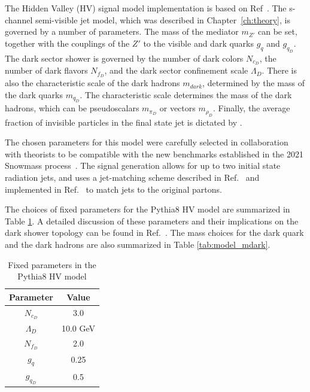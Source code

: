 The Hidden Valley (HV) signal model implementation is based on Ref~\cite{darkqcd}. 
The s-channel semi-visible jet model, which was described in Chapter~\ref{ch:theory}, is governed by a number of parameters. 
The mass of the mediator $m_{Z'}$ can be set, together with the couplings of the $Z'$ to the visible and dark quarks $g_q$ and $g_{q_D}$. 
The dark sector shower is governed by the number of dark colors $N_{c_D}$, the number of dark flavors $N_{f_D}$, and the dark sector confinement scale $\Lambda_D$. 
There is also the characteristic scale of the dark hadrons $m_{dark}$, determined by the mass of the dark quarks $m_{q_D}$. 
The characteristic scale determines the mass of the dark hadrons, which can be pseudoscalars $m_{\pi_D}$ or vectors $m_{\rho_D}$.
Finally, the average fraction of invisible particles in the final state jet is dictated by \rinv. 

The chosen parameters for this model were carefully selected in collaboration with theorists to be compatible with the new benchmarks established in the 2021 Snowmass process~\cite{snowmass}. 
The signal generation allows for up to two initial state radiation jets, and uses a jet-matching scheme described in Ref.~\cite{mlm} and implemented in Ref.~\cite{pythia} to match jets to the original partons.

The choices of fixed parameters for the Pythia8 HV model are summarized in Table \ref{tab:model_fixed_params}.
A detailed discussion of these parameters and their implications on the dark shower topology can be found in Ref.~\cite{snowmass}. 
The mass choices for the dark quark and the dark hadrons are also summarized in Table \ref{tab:model_mdark}. 

\begin{table}
\centering
  \begin{tabular}{ |c|c| }
    \hline
    Parameter & Value \\
    \hline
     $N_{c_D}$ & 3.0 \\
     $\Lambda_D$ & 10.0 GeV\\
     $N_{f_D}$ & 2.0\\
     $g_q$ & 0.25\\
     $g_{q_D}$ & 0.5\\
    \hline
  \end{tabular}
  \caption{Fixed parameters in the Pythia8 HV model}
  \label{tab:model_fixed_params}
\end{table}

